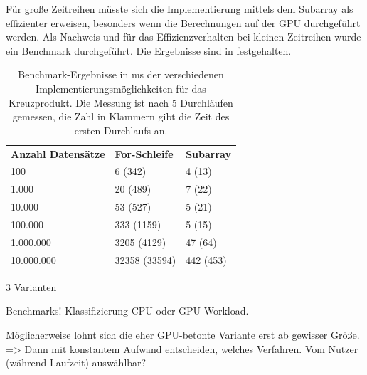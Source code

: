 \noindent Für große Zeitreihen müsste sich die Implementierung mittels dem Subarray als effizienter erweisen, besonders wenn die Berechnungen auf der \ac{GPU} durchgeführt werden.
Als Nachweis und für das Effizienzverhalten bei kleinen Zeitreihen wurde ein Benchmark durchgeführt.
Die Ergebnisse sind in  festgehalten.

\begin{table}[H]
	\centering
	\begin{tabular}{ | p{5cm} | p{3.5cm} | p{3.5cm} | }
		\hline \rowcolor{gray!15}
		\textbf{Anzahl Datensätze} & \textbf{For-Schleife} & \textbf{Subarray} \\ \hhline{|=|=|=|}
		100 & 6 (342) & 4 (13) \\ \hline
		1.000 & 20 (489) & 7 (22) \\ \hline
		10.000 & 53 (527) & 5 (21) \\ \hline
		100.000 & 333 (1159) & 5 (15) \\ \hline
		1.000.000 & 3205 (4129) & 47 (64) \\ \hline
		10.000.000 & 32358 (33594) & 442 (453) \\ \hline

	\end{tabular}
	\caption{Benchmark-Ergebnisse in ms der verschiedenen Implementierungsmöglichkeiten für das Kreuzprodukt. Die Messung ist nach 5 Durchläufen gemessen, die Zahl in Klammern gibt die Zeit des ersten Durchlaufs an.}
	\label{tab:Benchmark_Kreuzprodukt_Implementierung}
\end{table}

3 Varianten

Benchmarks!
Klassifizierung \ac{CPU} oder \ac{GPU}-Workload.

Möglicherweise lohnt sich die eher \ac{GPU}-betonte Variante erst ab gewisser Größe.
=> Dann mit konstantem Aufwand entscheiden, welches Verfahren.
Vom Nutzer (während Laufzeit) auswählbar?
\endinput

